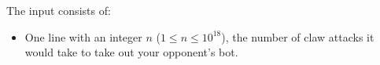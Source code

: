 
    The input consists of:
    \begin{itemize}
        \item One line with an integer $n$ ($1\leq n\leq 10^{18}$), the number of claw attacks it
            would take to take out your opponent's bot.
    \end{itemize}
